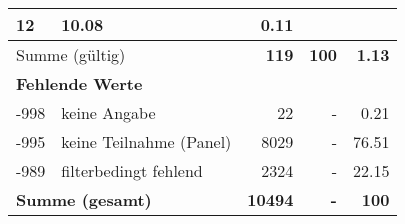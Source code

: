 \begin{longtable}{lXrrr}
       \num{12} &
       \num[round-mode=places,round-precision=2]{10.08} &
         \num[round-mode=places,round-precision=2]{0.11} \\
     \midrule
     \multicolumn{2}{l}{Summe (gültig)} &
       \textbf{\num{119}} &
     \textbf{\num{100}} &
       \textbf{\num[round-mode=places,round-precision=2]{1.13}} \\
     \multicolumn{5}{l}{\textbf{Fehlende Werte}}\\
       -998 &
       keine Angabe &
         \num{22} &
        - &
         \num[round-mode=places,round-precision=2]{0.21} \\
       -995 &
       keine Teilnahme (Panel) &
         \num{8029} &
        - &
         \num[round-mode=places,round-precision=2]{76.51} \\
       -989 &
       filterbedingt fehlend &
         \num{2324} &
        - &
         \num[round-mode=places,round-precision=2]{22.15} \\
     \midrule
     \multicolumn{2}{l}{\textbf{Summe (gesamt)}} &
          \textbf{\num{10494}} &
        \textbf{-} &
        \textbf{\num{100}} \\
     \bottomrule
     \end{longtable}
     
